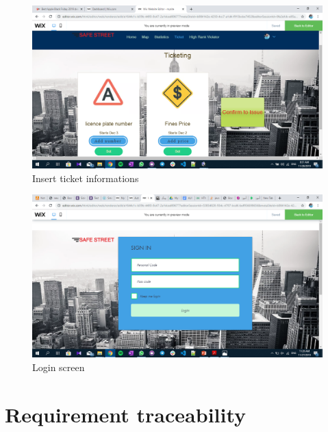 \documentclass{article}
\begin{document}
		\begin{figure}[h]
			\includegraphics[width=\linewidth]{images/ticketing.png}
			\caption{Insert ticket informations}
			\label{fig:web_ticket}
		\end{figure}
		\begin{figure}[h]
			\includegraphics[width=\linewidth]{images/log_in.png}
			\caption{Login screen}
			\label{fig:web_login}
		\end{figure}
\FloatBarrier
\section{Requirement traceability}	
	
\end{document}
